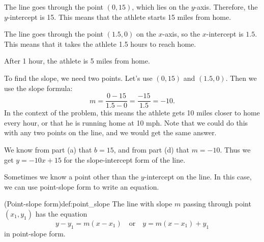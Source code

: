 \documentclass{article}
\begin{document}
\begin{solution}
    \begin{problem}
        \item The line goes through the point $(0,15)$, which lies on the $y$-axis. Therefore, the $y$-intercept is 15. This means that the athlete starts 15 miles from home.
        \item The line goes through the point $(1.5,0)$ on the $x$-axis, so the $x$-intercept is $1.5$. This means that it takes the athlete 1.5 hours to reach home.
        \item After 1 hour, the athlete is 5 miles from home.
        \item To find the slope, we need two points. Let's use $(0,15)$ and $(1.5,0)$. Then we use the slope formula: \[m=\frac{0-15}{1.5-0}=\frac{-15}{1.5}=-10.\] In the context of the problem, this means the athlete gets 10 miles closer to home every hour, or that he is running home at 10 mph.
        Note that we could do this with any two points on the line, and we would get the same answer.
        \item We know from part (a) that $b=15$, and from part (d) that $m=-10$. Thus we get $y=-10x+15$ for the slope-intercept form of the line.
    \end{problem}
\end{solution}

Sometimes we know a point other than the $y$-intercept on the line. In this case, we can use point-slope form to write an equation.
\begin{definition}{(Point-slope form)}{def:point_slope}
    The line with slope $m$ passing through point $(x_1,y_1)$ has the equation \[y-y_1=m(x-x_1)\quad\text{or}\quad y=m(x-x_1)+y_1\] in point-slope form.
\end{definition}
\end{document}
